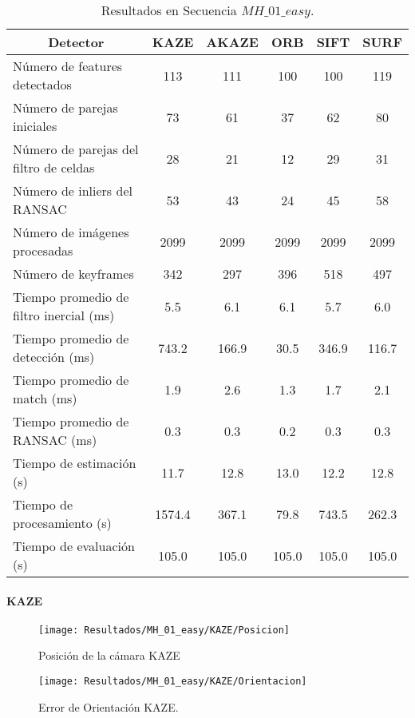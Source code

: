 \begin{table}[H]
	\caption{Resultados en Secuencia $MH\_ 01\_ easy$.}
	\begin{tabular}{|l|c|c|c|c|c|}
		\hline
		\multicolumn{1}{|c|}{\textbf{Detector}} & \textbf{KAZE} & \textbf{AKAZE} & \textbf{ORB} & \textbf{SIFT} & \textbf{SURF} \\ \hline
		Número de features detectados & 113 & 111 & 100 & 100 & 119 \\ \hline
		Número de parejas iniciales & 73 & 61 & 37 & 62 & 80 \\ \hline
		Número de parejas del filtro de celdas & 28 & 21 & 12 & 29 & 31 \\ \hline
		Número de inliers del RANSAC & 53 & 43 & 24 & 45 & 58 \\ \hline
		Número de imágenes procesadas & 2099 & 2099 & 2099 & 2099 & 2099 \\ \hline
		Número de keyframes & 342 & 297 & 396 & 518 & 497 \\ \hline
		Tiempo promedio de filtro inercial (ms) & 5.5 & 6.1 & 6.1 & 5.7 & 6.0 \\ \hline
		Tiempo promedio de detección  (ms) & 743.2 & 166.9 & 30.5 & 346.9 & 116.7 \\ \hline
		Tiempo promedio de match (ms) & 1.9 & 2.6 & 1.3 & 1.7 & 2.1 \\ \hline
		Tiempo promedio de RANSAC (ms) & 0.3 & 0.3 & 0.2 & 0.3 & 0.3 \\ \hline
		Tiempo de estimación (s) & 11.7 & 12.8 & 13.0 & 12.2 & 12.8 \\ \hline
		Tiempo de  procesamiento (s) & 1574.4 & 367.1 & 79.8 & 743.5 & 262.3 \\ \hline
		Tiempo de evaluación (s) & 105.0 & 105.0 & 105.0 & 105.0 & 105.0 \\ \hline
	\end{tabular}
	\label{Tabla/Resultados/MH_01_easy}
\end{table}

\paragraph {KAZE}


\begin{figure}[H]
	\centering
	\texttt{[image: Resultados/MH\_01\_easy/KAZE/Posicion]}
	\caption{Posición de la cámara KAZE}
	\label{imagen:Resultados/MH_01_easy/KAZE/Posicion}
\end{figure}


\begin{figure}[H]
	\centering
	\texttt{[image: Resultados/MH\_01\_easy/KAZE/Orientacion]}
	\caption[Error de Orientación KAZE]{Error de Orientación KAZE.}
	\label{imagen:Resultados/MH_01_easy/KAZE/Orientacion}
\end{figure}


